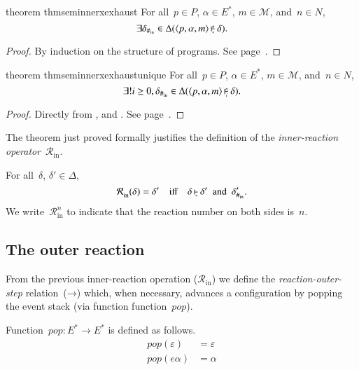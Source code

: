 \documentclass[10pt,a4paper,oneside,leqno]{article}
\makeatletter
\numberwithin{equation}{section}
\let\nil=\varepsilon
\def\<#1>{\langle#1\rangle}
\def\pop{\mathit{pop}}
\def\Hinner{{\#_{\mathrm{in}}}}
\newcommand\Rinner[1][]{{\mathcal{R}_{\mathrm{in}}^{#1}}}
\def\@inner#1#2{%
  \setbox0=\hbox{$\vdash$}%
  \setbox1=\hbox{$\scriptscriptstyle#1$}%
  \setbox2=\hbox{$\scriptscriptstyle#2$}%
  \ifdim\wd1>\wd2
    \setbox2=\hbox to\wd1{\hfil$\scriptscriptstyle#2$\hfil}%
  \else
    \setbox1=\hbox to\wd2{\hfil$\scriptscriptstyle#1$\hfil}%
  \fi
  \setbox3=\hbox{$\null^{\box1}_{\box2}$}%
  \dimen0=.6ex
  \ifdim\wd3>\dimen0
    \dimen0=\wd3
  \fi
  \rlap{\hbox{$\vrule height\the\ht0 depth\the\dp0 width.6pt
      \vcenter{\hrule height.3pt depth.3pt width\dimen0}$}}%
  \kern1pt\box3
}
\newcommand{\inner}[2][]{\mathbin{\@inner{#2}{#1}}}
\newcommand{\innerx}[1]{\inner[\ast]{#1}}
\newcommand{\outersym}{\mathord{\to}}
\makeatother
\begin{document}
\begin{restatable}[label={thm:sem:innerx:exhaust}]{theorem}
  {thmseminnerxexhaust}
  For all~$p\in{P}$, $\alpha\in{E^*}$, $m\in\mathcal{M}$, and~$n\in{N}$,
  \[
    \exists\delta_\Hinner\in\Delta(\<p,\alpha,m>\innerx{n}\delta).
  \]
\end{restatable}
\begin{proof}
  By induction on the structure of programs.  See
  page~\pageref{proof:thm:sem:innerx:exhaust}.
\end{proof}

\begin{restatable}[label={thm:sem:innerx:exhaust-unique}]{theorem}
  {thmseminnerxexhaustunique}
  For all~$p\in{P}$, $\alpha\in{E^*}$, $m\in\mathcal{M}$, and~$n\in{N}$,
  \[
    \exists!i\ge0,\delta_\Hinner\in\Delta(\<p,\alpha,m>\inner[i]{n}\delta).
  \]
\end{restatable}
\begin{proof}
  Directly from , and
  .  See
  page~\pageref{proof:thm:sem:innerx:exhaust-unique}.
\end{proof}

The theorem just proved formally justifies the definition of the
\emph{inner-reaction operator}~$\Rinner$.

\begin{definition}[name={Inner reaction},label={def:inner:R}]
  For all~$\delta$, $\delta'\in\Delta$,
  \[
    \Rinner(\delta)=\delta'
    \quad\text{iff}\quad
    \delta\innerx{}\delta'
    \enspace\text{and}\enspace
    \delta'_\Hinner.
  \]
  We write~$\Rinner[n]$ to indicate that the reaction number on both sides
  is~$n$.
\end{definition}


\subsection{The outer reaction}
\label{sub:sem:outer}

From the previous inner-reaction operation ($\Rinner$) we define the
\emph{reaction-outer-step} relation~($\outersym$) which, when necessary,
advances a configuration by popping the event stack (via function
function~$\pop$).

\begin{definition}[label={def:sem:pop}]
  Function~$\pop\colon{E^*}\to{E^*}$ is defined as follows.
  \begin{align*}
    \pop(\nil)&=\nil\\
    \pop(e\alpha)&=\alpha
  \end{align*}
\end{definition}
\end{document}
